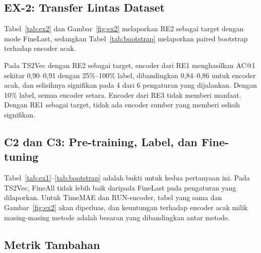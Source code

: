 \subsection{EX-2: Transfer Lintas Dataset}
Tabel~\ref{tab:ex2} dan Gambar~\ref{fig:ex2} melaporkan RE2 sebagai target dengan mode FineLast, sedangkan Tabel~\ref{tab:bootstrap} melaporkan paired bootstrap terhadap encoder acak.



Pada TS2Vec dengan RE2 sebagai target, encoder dari RE1 menghasilkan AC@1 sekitar 0,90--0,91 dengan 25\%--100\% label, dibandingkan 0,84--0,86 untuk encoder acak, dan selisihnya signifikan pada 4 dari 6 pengaturan yang dijalankan. Dengan 10\% label, semua encoder setara. Encoder dari RE3 tidak memberi manfaat. Dengan RE1 sebagai target, tidak ada encoder sumber yang memberi selisih signifikan.

\subsection{C2 dan C3: Pre-training, Label, dan Fine-tuning}
Tabel~\ref{tab:ex1}--\ref{tab:bootstrap} adalah bukti untuk kedua pertanyaan ini. Pada TS2Vec, FineAll tidak lebih baik daripada FineLast pada pengaturan yang dilaporkan. Untuk TimeMAE dan RUN-encoder, tabel yang sama dan Gambar~\ref{fig:ex2} akan diperluas, dan keuntungan terhadap encoder acak milik masing-masing metode adalah besaran yang dibandingkan antar metode.

\subsection{Metrik Tambahan}
